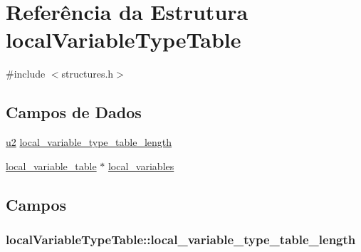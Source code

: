 \hypertarget{structlocalVariableTypeTable}{}\section{Referência da Estrutura local\+Variable\+Type\+Table}
\label{structlocalVariableTypeTable}


{\ttfamily \#include $<$structures.\+h$>$}

\subsection*{Campos de Dados}
\begin{DoxyCompactItemize}
\item 
\hyperlink{lista__operandos_8h_a732cde1300aafb73b0ea6c2558a7a54f}{u2} \hyperlink{structlocalVariableTypeTable_a9d0ce3852fcf1ee2c60d8c098caaff76}{local\+\_\+variable\+\_\+type\+\_\+table\+\_\+length}
\item 
\hyperlink{structlocal__variable__table}{local\+\_\+variable\+\_\+table} $\ast$ \hyperlink{structlocalVariableTypeTable_acb5bcd42df545b2aeb7517e01e1b5ed0}{local\+\_\+variables}
\end{DoxyCompactItemize}


\subsection{Campos}
\subsubsection[{\texorpdfstring{local\+\_\+variable\+\_\+type\+\_\+table\+\_\+length}{local_variable_type_table_length}}]{ local\+Variable\+Type\+Table\+::local\+\_\+variable\+\_\+type\+\_\+table\+\_\+length}\hypertarget{structlocalVariableTypeTable_a9d0ce3852fcf1ee2c60d8c098caaff76}{}\label{structlocalVariableTypeTable_a9d0ce3852fcf1ee2c60d8c098caaff76}
